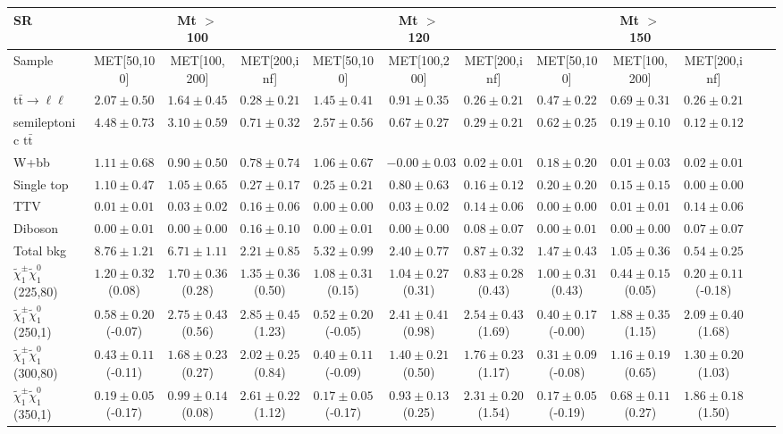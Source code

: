 \begin{table}
\begin{center}
\small
\begin{tabular}{lccccccccccc}
\hline
SR & & Mt $>$ 100 & & & Mt $>$ 120 & & &Mt $>$ 150 & & &\\
\hline
Sample&MET[50,100]&MET[100,200]&MET[200,inf]&MET[50,100]&MET[100,200]&MET[200,inf]&MET[50,100]&MET[100,200]&MET[200,inf]&\\
\hline
$\mathrm{t}\bar{\mathrm{t}}\rightarrow \ell\ell$&$2.07\pm0.50$&$1.64\pm0.45$&$0.28\pm0.21$&$1.45\pm0.41$&$0.91\pm0.35$&$0.26\pm0.21$&$0.47\pm0.22$&$0.69\pm0.31$&$0.26\pm0.21$\\
semileptonic $\mathrm{t}\bar{\mathrm{t}}$&$4.48\pm0.73$&$3.10\pm0.59$&$0.71\pm0.32$&$2.57\pm0.56$&$0.67\pm0.27$&$0.29\pm0.21$&$0.62\pm0.25$&$0.19\pm0.10$&$0.12\pm0.12$\\
W+bb&$1.11\pm0.68$&$0.90\pm0.50$&$0.78\pm0.74$&$1.06\pm0.67$&$-0.00\pm0.03$&$0.02\pm0.01$&$0.18\pm0.20$&$0.01\pm0.03$&$0.02\pm0.01$\\
Single top&$1.10\pm0.47$&$1.05\pm0.65$&$0.27\pm0.17$&$0.25\pm0.21$&$0.80\pm0.63$&$0.16\pm0.12$&$0.20\pm0.20$&$0.15\pm0.15$&$0.00\pm0.00$\\
TTV&$0.01\pm0.01$&$0.03\pm0.02$&$0.16\pm0.06$&$0.00\pm0.00$&$0.03\pm0.02$&$0.14\pm0.06$&$0.00\pm0.00$&$0.01\pm0.01$&$0.14\pm0.06$\\
Diboson&$0.00\pm0.01$&$0.00\pm0.00$&$0.16\pm0.10$&$0.00\pm0.01$&$0.00\pm0.00$&$0.08\pm0.07$&$0.00\pm0.01$&$0.00\pm0.00$&$0.07\pm0.07$\\
\hline
Total bkg&$8.76\pm1.21$&$6.71\pm1.11$&$2.21\pm0.85$&$5.32\pm0.99$&$2.40\pm0.77$&$0.87\pm0.32$&$1.47\pm0.43$&$1.05\pm0.36$&$0.54\pm0.25$\\
$\tilde{\chi}_{1}^{\pm}\tilde{\chi}_{1}^{0}$ (225,80)&$1.20\pm0.32$(0.08)&$1.70\pm0.36$(0.28)&$1.35\pm0.36$(0.50)&$1.08\pm0.31$(0.15)&$1.04\pm0.27$(0.31)&$0.83\pm0.28$(0.43)&$1.00\pm0.31$(0.43)&$0.44\pm0.15$(0.05)&$0.20\pm0.11$(-0.18)\\
$\tilde{\chi}_{1}^{\pm}\tilde{\chi}_{1}^{0}$ (250,1)&$0.58\pm0.20$(-0.07)&$2.75\pm0.43$(0.56)&$2.85\pm0.45$(1.23)&$0.52\pm0.20$(-0.05)&$2.41\pm0.41$(0.98)&$2.54\pm0.43$(1.69)&$0.40\pm0.17$(-0.00)&$1.88\pm0.35$(1.15)&$2.09\pm0.40$(1.68)\\
$\tilde{\chi}_{1}^{\pm}\tilde{\chi}_{1}^{0}$ (300,80)&$0.43\pm0.11$(-0.11)&$1.68\pm0.23$(0.27)&$2.02\pm0.25$(0.84)&$0.40\pm0.11$(-0.09)&$1.40\pm0.21$(0.50)&$1.76\pm0.23$(1.17)&$0.31\pm0.09$(-0.08)&$1.16\pm0.19$(0.65)&$1.30\pm0.20$(1.03)\\
$\tilde{\chi}_{1}^{\pm}\tilde{\chi}_{1}^{0}$ (350,1)&$0.19\pm0.05$(-0.17)&$0.99\pm0.14$(0.08)&$2.61\pm0.22$(1.12)&$0.17\pm0.05$(-0.17)&$0.93\pm0.13$(0.25)&$2.31\pm0.20$(1.54)&$0.17\pm0.05$(-0.19)&$0.68\pm0.11$(0.27)&$1.86\pm0.18$(1.50)\\
\hline
\hline\hline
\end{tabular}
\end{center}
\end{table}
